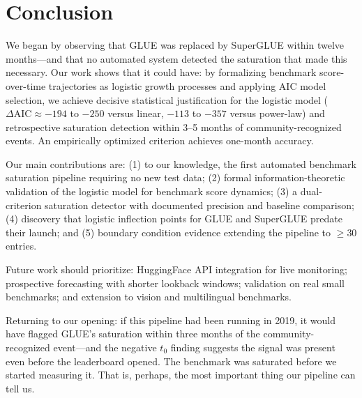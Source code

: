\section{Conclusion}

We began by observing that GLUE was replaced by SuperGLUE within twelve months---and that no automated system detected the saturation that made this necessary.
Our work shows that it could have: by formalizing benchmark score-over-time trajectories as logistic growth processes and applying AIC model selection, we achieve decisive statistical justification for the logistic model ($\Delta\text{AIC} \approx -194$ to $-250$ versus linear, $-113$ to $-357$ versus power-law) and retrospective saturation detection within 3--5 months of community-recognized events.
An empirically optimized criterion achieves one-month accuracy.

Our main contributions are: (1) to our knowledge, the first automated benchmark saturation pipeline requiring no new test data; (2) formal information-theoretic validation of the logistic model for benchmark score dynamics; (3) a dual-criterion saturation detector with documented precision and baseline comparison; (4) discovery that logistic inflection points for GLUE and SuperGLUE predate their launch; and (5) boundary condition evidence extending the pipeline to $\geq$30 entries.

Future work should prioritize: HuggingFace API integration for live monitoring; prospective forecasting with shorter lookback windows; validation on real small benchmarks; and extension to vision and multilingual benchmarks.

Returning to our opening: if this pipeline had been running in 2019, it would have flagged GLUE's saturation within three months of the community-recognized event---and the negative $t_0$ finding suggests the signal was present even before the leaderboard opened.
The benchmark was saturated before we started measuring it.
That is, perhaps, the most important thing our pipeline can tell us.
